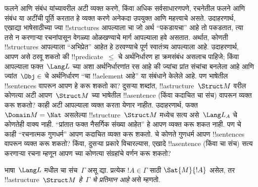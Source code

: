 \documentclass[../../../include/open-logic-section]{subfiles}
\begin{document}


\begin{explain}
फलने आणि संबंध यांच्यावरील अटी व्यक्त करणे, किंवा अधिक सर्वसाधारणपणे,
रचनेतील फलने आणि संबंध या अटींची पूर्ति करतात हे व्यक्त करणे अनेकदा
उपयुक्त आणि महत्त्वाचे असते. उदाहरणार्थ, एखाद्या भाषेसाठीच्या ज्या
!!{structure}s आपल्याला चा जो अर्थ ``पकडायचा'' आहे तो
पकडतात, त्या तसे न करणाऱ्या रचनांपासून वेगळ्या ओळखण्याचे मार्ग आपल्याला
हवे असतात. अर्थात, कोणती !!{structure}s आपल्याला ``अभिप्रेत'' आहेत हे
ठरवण्याचे पूर्ण स्वातंत्र्य आपल्याला आहे. उदाहरणार्थ, आपण असे ठरवू शकतो
की !!{predicate}~$\le$ चे अर्थनिर्धारण हा क्रमसंबंध असलाच पाहिजे; किंवा
आपल्याला फक्त~$\Lang L$ च्या अशा अर्थनिर्धारणांत रस आहे की ज्यांचा प्रांत
संचांचा बनलेला आहे आणि ज्यांत~$\Obj \in$ चे अर्थनिर्धारण ``चा
!!a{element} आहे'' या संबंधाने केलेले आहे. पण भाषेतील !!{sentence}s वापरून
आपण हे करू शकतो का? दुसऱ्या शब्दांत, !!a{structure}~$\Struct M$ वरील
कोणत्या अटी आपण~$\Struct M$ च्या भाषेतील !!a{sentence} (किंवा कदाचित
चा संच) वापरून व्यक्त करू शकतो? काही अटी आपल्याला व्यक्त करता
येणार नाहीत. उदाहरणार्थ, फक्त $\Domain M = \Nat$ असलेल्या
!!{structure}~$\Struct M$ मध्येच सत्य असे~$\Lang L_A$ चे कोणतेही वाक्य
नाही. ``प्रांतात फक्त नैसर्गिक संख्या आहेत'' हे आपण व्यक्त करू शकत नाही.
पण चे काही ``रचनात्मक गुणधर्म'' आपण कदाचित व्यक्त करू शकतो.
चे कोणते गुणधर्म आपण !!{sentence}s वापरून व्यक्त करू शकतो?
किंवा, दुसऱ्या प्रकारे विचारल्यास, एखादे !!a{sentence} (किंवा
चा संच) सत्य करणाऱ्या रचना म्हणून आपण
च्या कोणत्या संग्रहांचे वर्णन करू शकतो?
\end{explain}

\begin{defn}[संचाचे प्रतिमान]
भाषा~$\Lang L$ मधील चा संच~$\Gamma$ असू द्या. प्रत्येक
$!A \in \Gamma$ साठी $\Sat{M}{!A}$ असेल, तर !!a{structure}~$\Struct M$
\emph{हे~$\Gamma$ चे प्रतिमान आहे} असे म्हणतो.
\end{defn}
\end{document}

